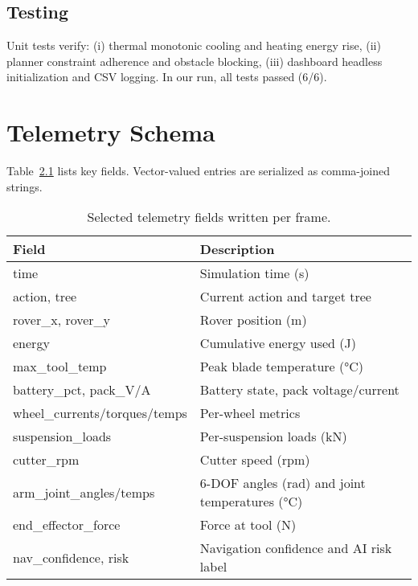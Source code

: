 \documentclass[12pt,a4paper]{report}
\begin{document}
\section{Testing}
Unit tests verify: (i) thermal monotonic cooling and heating energy rise, (ii) planner constraint adherence and obstacle blocking, (iii) dashboard headless initialization and CSV logging. In our run, all tests passed (6/6).

\chapter{Telemetry Schema}
Table~\ref{tab:telemetry} lists key fields. Vector-valued entries are serialized as comma-joined strings.

\begin{table}[h]
  \centering
  \small
  \begin{tabular}{ll}
    \toprule
    Field & Description \\
    \midrule
    time & Simulation time (s) \\
    action, tree & Current action and target tree \\
    rover\_x, rover\_y & Rover position (m) \\
    energy & Cumulative energy used (J) \\
    max\_tool\_temp & Peak blade temperature (\si{\celsius}) \\
    battery\_pct, pack\_V/A & Battery state, pack voltage/current \\
    wheel\_currents/torques/temps & Per-wheel metrics \\
    suspension\_loads & Per-suspension loads (kN) \\
    cutter\_rpm & Cutter speed (rpm) \\
    arm\_joint\_angles/temps & 6-DOF angles (rad) and joint temperatures (\si{\celsius}) \\
    end\_effector\_force & Force at tool (N) \\
    nav\_confidence, risk & Navigation confidence and AI risk label \\
    \bottomrule
  \end{tabular}
  \caption{Selected telemetry fields written per frame.}
  \label{tab:telemetry}
\end{table}
\end{document}
